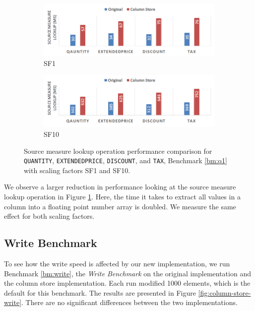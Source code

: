 \begin{figure}
    \centering
    \begin{subfigure}{1.0\textwidth}
        \includegraphics[width=\textwidth]{img/column-store-sml-sf001.png}
        \caption{SF1}
    \end{subfigure}
    \begin{subfigure}{1.0\textwidth}
        \includegraphics[width=\textwidth]{img/column-store-sml-sf010.png}
        \caption{SF10}
    \end{subfigure}
    \caption{Source measure lookup operation performance comparison for \texttt{QUANTITY}, \texttt{EXTENDEDPRICE}, \texttt{DISCOUNT}, and \texttt{TAX}, Benchmark \ref{bm:q1} with scaling factors SF1 and SF10.}
    \label{fig:column-store-sml}
\end{figure}

We observe a larger reduction in performance looking at the source measure lookup operation in Figure \ref{fig:column-store-sml}. Here, the time it takes to extract all values in a column into a floating point number array is doubled. We measure the same effect for both scaling factors.

\subsection{Write Benchmark}
\label{sub:Write Benchmark}
To see how the write speed is affected by our new implementation, we run Benchmark \ref{bm:write}, the \textit{Write Benchmark} on the original implementation and the column store implementation. Each run modified 1000 elements, which is the default for this benchmark. The results are presented in Figure \ref{fig:column-store-write}. There are no significant differences between the two implementations.

